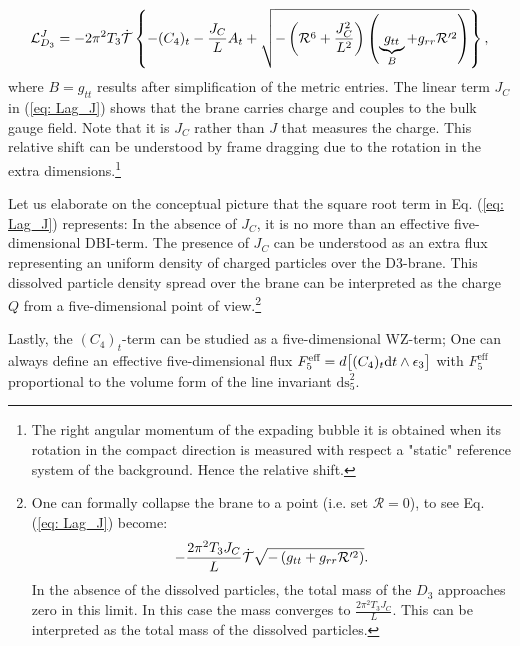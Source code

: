 \begin{equation}\label{eq: Lag_J}
    \mathcal{L}_{D_{3}}^J = -2\pi^2 T_3 \dot{\mathcal{T}} \left\{-(C_4)_t  - \frac{J_C}{L}A_t  + \sqrt{-\left(\mathcal{R}^6 + \frac{J_C^2}{L^2}\right) \left(\underbrace{g_{tt}}_{B}+g_{rr} \mathcal{R}'^2 \right) } \right\},
\end{equation}
where $B = g_{tt}$ results after simplification of the metric entries. The linear term $J_C$ in (\ref{eq: Lag_J}) shows that the brane carries charge and couples to the bulk gauge field. Note that it is $J_C$ rather than $J$ that measures the charge. This relative shift can be understood by frame dragging due to the rotation in the extra dimensions.\footnote{The right angular momentum of the expading bubble it is obtained when its rotation in the compact direction is measured with respect a "static" reference system of the background. Hence the relative shift.}

Let us elaborate on the conceptual picture that the square root term in Eq. (\ref{eq: Lag_J}) represents: In the absence of $J_C$, it is no more than an effective five-dimensional DBI-term. The presence of $J_C$ can be understood as an extra flux representing an uniform density of charged particles over the D3-brane. This dissolved particle density spread over the brane can be interpreted as the charge $Q$ from a five-dimensional point of view.\footnote{One can formally collapse the brane to a point (i.e. set $\mathcal{R} = 0$), to see Eq. (\ref{eq: Lag_J}) become:
\begin{equation}
    -\frac{2\pi^2 T_3 J_C}{ L}\dot{\mathcal{T}}  \sqrt{- \left(g_{tt}+g_{rr} \mathcal{R}'^2 \right)}.
\end{equation}
In the absence of the dissolved particles, the total mass of the $D_{3}$ approaches zero in this limit. In this case the mass converges to $\frac{2\pi^2 T_3 J_C}{L}$. This can be interpreted as the total mass of the dissolved particles.} 

Lastly, the $(C_4)_t$-term can be studied as a five-dimensional WZ-term; One can always define an effective five-dimensional flux $F_5^{\text{eff}}=d\big[(C_4)_t \text{d} t\wedge\epsilon_3\big]$ with $F_5^{\text{eff}}$ proportional to the volume form of the line invariant $\text{ds}_5^2$.

